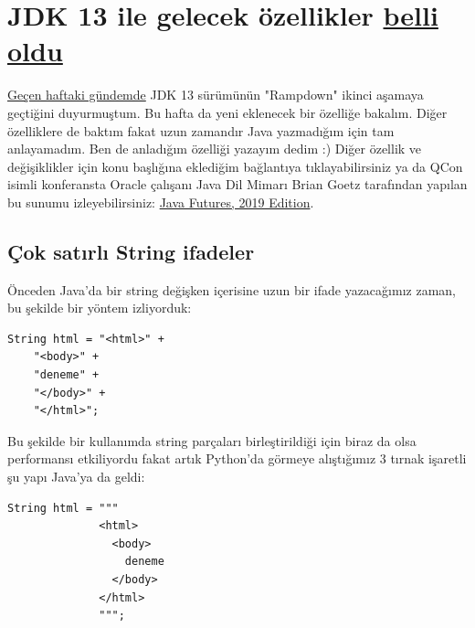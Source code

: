 \documentclass[11pt]{article}
\begin{document}
\section{JDK 13 ile gelecek özellikler \href{https://www.javaworld.com/article/3341388/jdk-13-the-new-features-coming-to-java-13.html}{belli oldu}}
\label{sec:orgcd3c406}
\href{../02/yazilim-gundemi-02.pdf}{Geçen haftaki gündemde} JDK 13 sürümünün "Rampdown" ikinci aşamaya geçtiğini
duyurmuştum. Bu hafta da yeni eklenecek bir özelliğe bakalım. Diğer özelliklere
de baktım fakat uzun zamandır Java yazmadığım için tam anlayamadım. Ben de
anladığım özelliği yazayım dedim :) Diğer özellik ve değişiklikler için konu
başlığına eklediğim bağlantıya tıklayabilirsiniz ya da QCon isimli konferansta
Oracle çalışanı Java Dil Mimarı Brian Goetz tarafından yapılan bu sunumu
izleyebilirsiniz: \href{https://www.infoq.com/presentations/java-futures-2019/}{Java Futures, 2019 Edition}.

\subsection{Çok satırlı String ifadeler}
\label{sec:org0875200}
Önceden Java'da bir string değişken içerisine uzun bir ifade yazacağımız
zaman, bu şekilde bir yöntem izliyorduk:

\begin{verbatim}
String html = "<html>" +
    "<body>" +
    "deneme" +
    "</body>" +
    "</html>";
\end{verbatim}
Bu şekilde bir kullanımda string parçaları birleştirildiği için biraz da olsa
performansı etkiliyordu fakat artık Python'da görmeye alıştığımız 3 tırnak
işaretli şu yapı Java'ya da geldi:

\begin{verbatim}
String html = """
              <html>
                <body>
                  deneme
                </body>
              </html>
              """;
\end{verbatim}
\end{document}
